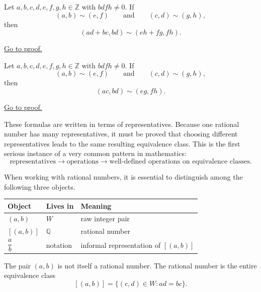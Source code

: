 \begin{lemma}
\label{lem:rational-addition-well-defined}
Let $a,b,c,d,e,f,g,h\in\mathbb{Z}$ with $bdfh\neq 0$. If
\[
(a,b)\sim(e,f)
\qquad\text{and}\qquad
(c,d)\sim(g,h),
\]
then
\[
(ad+bc,bd)\sim(eh+fg,fh).
\]
\end{lemma}

\begin{remark*}[Proof]
\hyperref[prf:rational-addition-well-defined]{Go to proof.}
\end{remark*}

\begin{lemma}
\label{lem:rational-multiplication-well-defined}
Let $a,b,c,d,e,f,g,h\in\mathbb{Z}$ with $bdfh\neq 0$. If
\[
(a,b)\sim(e,f)
\qquad\text{and}\qquad
(c,d)\sim(g,h),
\]
then
\[
(ac,bd)\sim(eg,fh).
\]
\end{lemma}

\begin{remark*}[Proof]
\hyperref[prf:rational-multiplication-well-defined]{Go to proof.}
\end{remark*}

\begin{remark}
\label{rem:well-definedness-matters}

These formulas are written in terms of representatives.  Because one rational number has many
representatives, it must be proved that choosing different representatives leads to the same
resulting equivalence class.  This is the first serious instance of a very common pattern in
mathematics:
\[
\text{representatives}
\longrightarrow
\text{operations}
\longrightarrow
\text{well-defined operations on equivalence classes}.
\]

\end{remark}

\begin{remark}
\label{rem:rational-three-levels}

When working with rational numbers, it is essential to distinguish among the following three objects.

\begin{center}
\begin{tabular}{lll}
\toprule
\textbf{Object} & \textbf{Lives in} & \textbf{Meaning} \\
\midrule
$(a,b)$ & $W$ & raw integer pair \\
$[(a,b)]$ & $\mathbb{Q}$ & rational number \\
$\dfrac{a}{b}$ & notation & informal representation of $[(a,b)]$ \\
\bottomrule
\end{tabular}
\end{center}

The pair $(a,b)$ is not itself a rational number.  The rational number is the entire equivalence
class
\[
[(a,b)] = \{(c,d)\in W : ad = bc\}.
\]

\end{remark}

